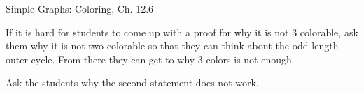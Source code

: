\documentclass[handout]{mcs}
\begin{document}

\begin{staffnotes}
Simple Graphs: Coloring, Ch. 12.6
\end{staffnotes}





\begin{staffnotes}
If it is hard for students to come up with a proof for why it is not 3 colorable, ask them why it is not two colorable so that they can think about the odd length outer cycle. From there they can get to why 3 colors is not enough.
\end{staffnotes}


\instatements{\newpage}

\begin{staffnotes}
Ask the students why the second statement does not work.
\end{staffnotes}



\end{document}

